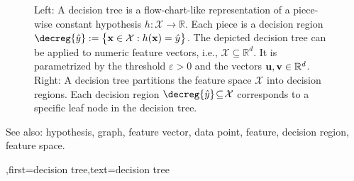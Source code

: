 {{\begin{figure}[H]
\begin{minipage}{.45\textwidth}
\end{minipage}
	\caption{Left: A decision tree is a flow-chart-like representation of a piece-wise constant hypothesis $h: \mathcal{X} \rightarrow \mathbb{R}$.  Each piece is a decision region $\decreg{\hat{y}} := \big\{ {\bf x} \in  \mathcal{X}: h({\bf x}) = \hat{y} \big\}$. 
		The depicted decision tree can be applied to numeric feature vectors, i.e., $\mathcal{X} \subseteq \mathbb{R}^{d}$. It is  parametrized by the threshold $\varepsilon>0$ and the vectors ${\bf u}, {\bf v} \in \mathbb{R}^{d}$. 
		Right: A decision tree partitions  
		the feature space $\mathcal{X}$ into decision regions. Each decision region  
		$\decreg{\hat{y}} \!\subseteq\!\mathcal{X}$ corresponds to a specific leaf node in the decision tree.}
	\label{fig_decision_tree}
\end{figure} 
		See also: hypothesis, graph, feature vector, data point, feature, decision region, feature space.
	  }
	  ,first={decision tree},text={decision tree} }



